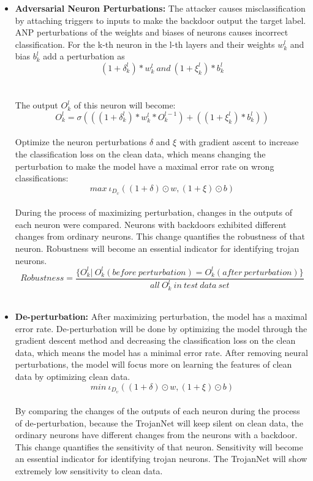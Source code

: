 \documentclass[english,version-2022-01]{uzl-thesis}
\begin{document}
\begin{itemize}
    \item \textbf{Adversarial Neuron Perturbations:} The attacker causes misclassification by attaching triggers to inputs to make the backdoor output the target label. ANP perturbations of the weights and biases of neurons causes incorrect classification. For the k-th neuron in the l-th layers and their weights $w_{k}^{l}$ and bias $b_{k}^{l}$ add a perturbation as 
    $$(1+\delta_{k}^{l})*w_{k}^{l} \ and\ (1+\xi_{k}^{l})*b_{k}^{l}$$\\
\\
    The output $O_{k}^{l}$ of this neuron will become:
     $$O_{k}^{l}=\sigma(((1+\delta_{k}^{l})*w_{k}^{l}*O_{k}^{l-1})+((1+\xi_{k}^{l})*b_{k}^{l}))$$\\
    Optimize the neuron perturbations $\delta$ and $\xi$ with gradient ascent to increase the classification loss on the clean data, which means changing the perturbation to make the model have a maximal error rate on wrong classifications:
      $$max\ \iota_{D_\upsilon}((1+\delta)\odot w, (1+\xi)\odot b)$$\\
    During the process of maximizing perturbation, changes in the outputs of each neuron were compared. Neurons with backdoors exhibited different changes from ordinary neurons. This change quantifies the robustness of that neuron. Robustness will become an essential indicator for identifying trojan neurons.\\
      $$Robustness = \frac{\{O_{k}^{l}|\ O_{k}^{l}(before \ perturbation)=O_{k}^{l}(after \ perturbation)\}}{all\ O_{k}^{l}\ in\ test\ data\ set}$$
    \\
    \item \textbf{De-perturbation:}\label{DePert} After maximizing perturbation, the model has a maximal error rate. De-perturbation will be done by optimizing the model through the gradient descent method and decreasing the classification loss on the clean data, which means the model has a minimal error rate. After removing neural perturbations, the model will focus more on learning the features of clean data by optimizing clean data.
      $$min\ \iota_{D_\upsilon}((1+\delta)\odot w, (1+\xi)\odot b)$$\\
    By comparing the changes of the outputs of each neuron during the process of de-perturbation, because the TrojanNet will keep silent on clean data, the ordinary neurons have different changes from the neurons with a backdoor. This change quantifies the sensitivity of that neuron. Sensitivity will become an essential indicator for identifying trojan neurons. The TrojanNet will show extremely low sensitivity to clean data.

\end{itemize}
\end{document}
